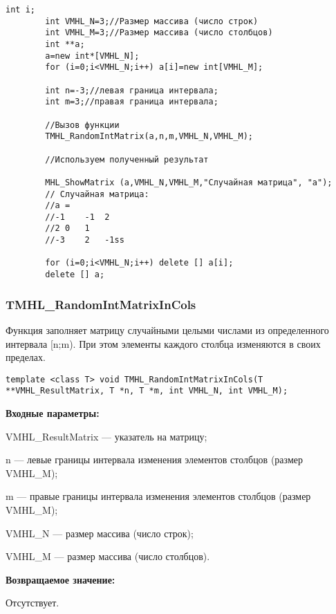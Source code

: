\documentclass[a4paper,12pt]{article}
\begin{document}
\begin{lstlisting}[label=code_use_TMHL_RandomIntMatrix,caption=Пример использования]
        int i;
        int VMHL_N=3;//Размер массива (число строк)
        int VMHL_M=3;//Размер массива (число столбцов)
        int **a;
        a=new int*[VMHL_N];
        for (i=0;i<VMHL_N;i++) a[i]=new int[VMHL_M];

        int n=-3;//левая граница интервала;
        int m=3;//правая граница интервала;

        //Вызов функции
        TMHL_RandomIntMatrix(a,n,m,VMHL_N,VMHL_M);

        //Используем полученный результат

        MHL_ShowMatrix (a,VMHL_N,VMHL_M,"Случайная матрица", "a");
        // Случайная матрица:
        //a =
        //-1	-1	2
        //2	0	1
        //-3	2	-1ss

        for (i=0;i<VMHL_N;i++) delete [] a[i];
        delete [] a;
\end{lstlisting}

\subsubsection{TMHL\_RandomIntMatrixInCols}\label{TMHL_RandomIntMatrixInCols}

Функция заполняет матрицу случайными целыми числами из определенного интервала [n;m). При этом элементы каждого столбца изменяются в своих пределах.


\begin{lstlisting}[label=code_syntax_TMHL_RandomIntMatrixInCols,caption=Синтаксис]
template <class T> void TMHL_RandomIntMatrixInCols(T **VMHL_ResultMatrix, T *n, T *m, int VMHL_N, int VMHL_M);
\end{lstlisting}

\textbf{Входные параметры:}
 
VMHL\_ResultMatrix --- указатель на матрицу;
 
n --- левые границы интервала изменения элементов столбцов (размер VMHL\_M);
 
m --- правые границы интервала изменения элементов столбцов (размер VMHL\_M);
 
VMHL\_N --- размер массива (число строк);
 
VMHL\_M --- размер массива (число столбцов).

\textbf{Возвращаемое значение:}

Отсутствует.
\end{document}
